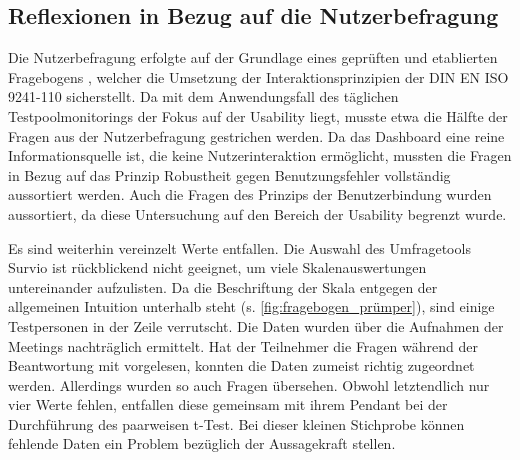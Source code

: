 
\subsection{Reflexionen in Bezug auf die Nutzerbefragung}
\label{ch:Diskussion:}

Die Nutzerbefragung erfolgte auf der Grundlage eines geprüften und etablierten Fragebogens \cite{Pruemper:Fragebogen-S:2006:Paper}, welcher die Umsetzung der Interaktionsprinzipien der DIN EN ISO 9241-110 \cite{DIN_EN_ISO_9241-110} sicherstellt. Da mit dem Anwendungsfall des täglichen Testpoolmonitorings der Fokus auf der Usability liegt, musste etwa die Hälfte der Fragen aus der Nutzerbefragung gestrichen werden.
Da das Dash\-board eine reine Informationsquelle ist, die keine Nutzerinteraktion ermöglicht, mussten die Fragen in Bezug auf das Prinzip Robustheit gegen Benutzungsfehler vollständig aussortiert werden. Auch die Fragen des Prinzips der Benutzerbindung wurden aussortiert, da diese Untersuchung auf den Bereich der Usability begrenzt wurde.


Es sind weiterhin vereinzelt Werte entfallen. Die Auswahl des Umfragetools Survio ist rückblickend nicht geeignet, um viele Skalenauswertungen untereinander aufzulisten. Da die Beschriftung der Skala entgegen der allgemeinen Intuition unterhalb steht (s. \autoref{fig:fragebogen_prümper}), sind einige Testpersonen in der Zeile verrutscht. Die Daten wurden über die Aufnahmen der Meetings nachträglich ermittelt. Hat der Teilnehmer die Fragen während der Beantwortung mit vorgelesen, konnten die Daten zumeist richtig zugeordnet werden. Allerdings wurden so auch Fragen übersehen. Obwohl letztendlich nur vier Werte fehlen, entfallen diese gemeinsam mit ihrem Pendant bei der Durchführung des paarweisen t-Test. Bei dieser kleinen Stichprobe können fehlende Daten ein Problem bezüglich der Aussagekraft stellen.

